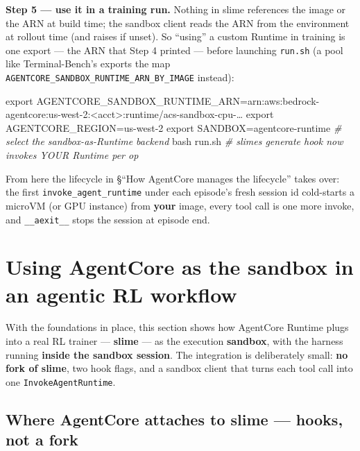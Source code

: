 \documentclass[
  paper=a4,
  ,captions=tableheading
]{scrartcl}
\newenvironment{Shaded}{}{}
\newcommand{\BuiltInTok}[1]{\textcolor[rgb]{0.00,0.50,0.00}{#1}}
\newcommand{\CommentTok}[1]{\textcolor[rgb]{0.38,0.63,0.69}{\textit{#1}}}
\newcommand{\FunctionTok}[1]{\textcolor[rgb]{0.02,0.16,0.49}{#1}}
\newcommand{\NormalTok}[1]{#1}
\newcommand{\OperatorTok}[1]{\textcolor[rgb]{0.40,0.40,0.40}{#1}}
\newcommand{\VariableTok}[1]{\textcolor[rgb]{0.10,0.09,0.49}{#1}}
\begin{document}
\textbf{Step 5 --- use it in a training run.} Nothing in slime
references the image or the ARN at build time; the sandbox client reads
the ARN from the environment at rollout time (and raises if unset). So
``using'' a custom Runtime in training is one export --- the ARN that
Step 4 printed --- before launching \texttt{run.sh} (a pool like
Terminal-Bench's exports the map
\texttt{AGENTCORE\_SANDBOX\_RUNTIME\_ARN\_BY\_IMAGE} instead):

\begin{Shaded}
\begin{Highlighting}[]
\BuiltInTok{export} \VariableTok{AGENTCORE\_SANDBOX\_RUNTIME\_ARN}\OperatorTok{=}\NormalTok{arn:aws:bedrock{-}agentcore:us{-}west{-}2:}\OperatorTok{\textless{}}\NormalTok{acct}\OperatorTok{\textgreater{}}\NormalTok{:runtime/acs{-}sandbox{-}cpu{-}…}
\BuiltInTok{export} \VariableTok{AGENTCORE\_REGION}\OperatorTok{=}\NormalTok{us{-}west{-}2}
\BuiltInTok{export} \VariableTok{SANDBOX}\OperatorTok{=}\NormalTok{agentcore{-}runtime          }\CommentTok{\# select the sandbox{-}as{-}Runtime backend}
\FunctionTok{bash}\NormalTok{ run.sh                               }\CommentTok{\# slime\textquotesingle{}s generate hook now invokes YOUR Runtime per op}
\end{Highlighting}
\end{Shaded}

From here the lifecycle in §``How AgentCore manages the lifecycle''
takes over: the first \texttt{invoke\_agent\_runtime} under each
episode's fresh session id cold-starts a microVM (or GPU instance) from
\textbf{your} image, every tool call is one more invoke, and
\texttt{\_\_aexit\_\_} stops the session at episode end.

\hypertarget{using-agentcore-as-the-sandbox-in-an-agentic-rl-workflow}{%
\section{Using AgentCore as the sandbox in an agentic RL
workflow}\label{using-agentcore-as-the-sandbox-in-an-agentic-rl-workflow}}

With the foundations in place, this section shows how AgentCore Runtime
plugs into a real RL trainer --- \textbf{slime} --- as the execution
\textbf{sandbox}, with the harness running \textbf{inside the sandbox
session}. The integration is deliberately small: \textbf{no fork of
slime}, two hook flags, and a sandbox client that turns each tool call
into one \texttt{InvokeAgentRuntime}.

\hypertarget{where-agentcore-attaches-to-slime-hooks-not-a-fork}{%
\subsection{Where AgentCore attaches to slime --- hooks, not a
fork}\label{where-agentcore-attaches-to-slime-hooks-not-a-fork}}
\end{document}
